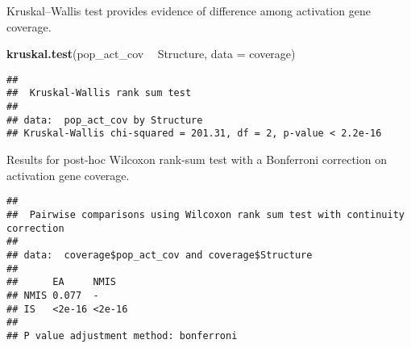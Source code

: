 \documentclass[]{book}
\newenvironment{Shaded}{\begin{snugshade}}{\end{snugshade}}
\newcommand{\DataTypeTok}[1]{\textcolor[rgb]{0.13,0.29,0.53}{#1}}
\newcommand{\KeywordTok}[1]{\textcolor[rgb]{0.13,0.29,0.53}{\textbf{#1}}}
\newcommand{\NormalTok}[1]{#1}
\newcommand{\OperatorTok}[1]{\textcolor[rgb]{0.81,0.36,0.00}{\textbf{#1}}}
\newcommand{\OtherTok}[1]{\textcolor[rgb]{0.56,0.35,0.01}{#1}}
\newcommand{\StringTok}[1]{\textcolor[rgb]{0.31,0.60,0.02}{#1}}
\begin{document}
Kruskal--Wallis test provides evidence of difference among activation gene coverage.

\begin{Shaded}
\begin{Highlighting}[]
\KeywordTok{kruskal.test}\NormalTok{(pop_act_cov }\OperatorTok{~}\StringTok{ }\NormalTok{Structure, }\DataTypeTok{data =}\NormalTok{ coverage)}
\end{Highlighting}
\end{Shaded}

\begin{verbatim}
## 
##  Kruskal-Wallis rank sum test
## 
## data:  pop_act_cov by Structure
## Kruskal-Wallis chi-squared = 201.31, df = 2, p-value < 2.2e-16
\end{verbatim}

Results for post-hoc Wilcoxon rank-sum test with a Bonferroni correction on activation gene coverage.

\begin{Shaded}
\end{Shaded}

\begin{verbatim}
## 
##  Pairwise comparisons using Wilcoxon rank sum test with continuity correction 
## 
## data:  coverage$pop_act_cov and coverage$Structure 
## 
##      EA     NMIS  
## NMIS 0.077  -     
## IS   <2e-16 <2e-16
## 
## P value adjustment method: bonferroni
\end{verbatim}


\end{document}
